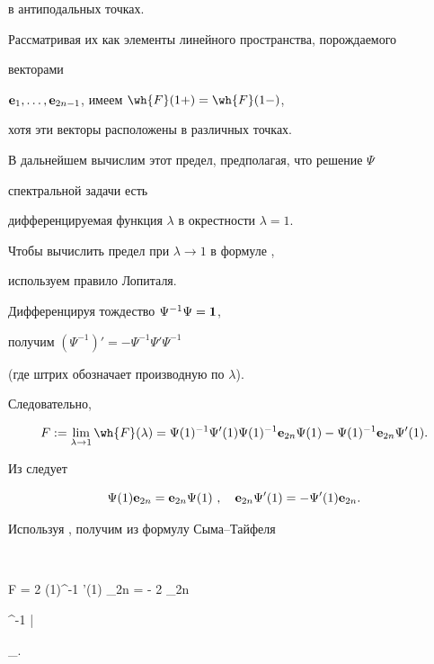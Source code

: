 в антиподальных точках.


Рассматривая их как элементы линейного пространства, порождаемого


векторами


$\bold e_1,\dotsc,\bold e_{2n-1}$, имеем $\wh{F} (1+) = \wh{F} (1-)$,


хотя эти векторы расположены в различных точках.


В дальнейшем вычислим этот предел, предполагая, что решение $\Psi$


спектральной задачи  есть


дифференцируемая функция $\lambda$ в окрестности $\lambda=1$.


Чтобы вычислить предел при $\lambda\rightarrow 1$ в формуле ,


используем правило Лопиталя.


Дифференцируя тождество $\Psi^{-1} \Psi = \bold 1$,


получим $(\Psi^{-1})'= - \Psi^{-1} \Psi' \Psi^{-1}$ 


(где штрих обозначает производную по $\lambda$).


Следовательно,


\begin{equation}


\label{F}


F := \lim_{\lambda \rightarrow 1} \wh{F}(\lambda) = \Psi(1)^{-1} 


\Psi'(1) \Psi(1)^{-1} \e_{2n} \Psi(1) - \Psi(1)^{-1} \e_{2n} 


\Psi'(1).


\end{equation}


Из  следует


\begin{equation}


\label{comm}


\Psi(1) \e_{2n} = \e_{2n} \Psi(1) \ , \quad \e_{2n} \Psi'(1) =


- \Psi'(1) \e_{2n}.


\end{equation}


Используя , получим из  формулу Сыма--Тайфеля


$$


F = 2 \Psi(1)^{-1} \Psi'(1) \e_{2n} = - 2 \e_{2n} 


\Psi^{-1} \frac{\partial \Psi}{\partial \lambda} \bigg|


_{}.


